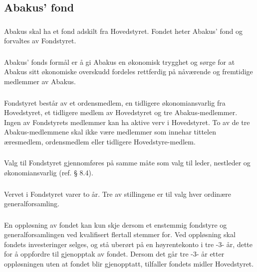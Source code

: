 \subsection{Abakus’ fond}

\subsubsection{}
Abakus skal ha et fond adskilt fra Hovedstyret. Fondet heter Abakus’ fond og forvaltes av Fondstyret.

\subsubsection{}
Abakus’ fonds formål er å gi Abakus en økonomisk trygghet og sørge for at Abakus sitt
økonomiske overskudd fordeles rettferdig på nåværende og fremtidige medlemmer av Abakus.

\subsubsection{}
Fondstyret består av et ordensmedlem, en tidligere økonomiansvarlig fra Hovedstyret, et tidligere
medlem av Hovedstyret og tre Abakus-medlemmer. Ingen av Fondstyrets medlemmer kan ha
aktive verv i Hovedstyret. To av de tre Abakus-medlemmene skal ikke være medlemmer som
innehar tittelen æresmedlem, ordensmedlem eller tidligere Hovedstyre-medlem.

\subsubsection{}
Valg til Fondstyret gjennomføres på samme måte som valg til leder, nestleder og
økonomiansvarlig (ref. § 8.4).

\subsubsection{}
Vervet i Fondstyret varer to år. Tre av stillingene er til valg hver ordinære generalforsamling.

\subsubsection{}
En oppløsning av fondet kan kun skje dersom et enstemmig fondstyre og generalforsamlingen
ved kvalifisert flertall stemmer for. Ved oppløsning skal fondets investeringer selges, og stå
uberørt på en høyrentekonto i tre -3- år, dette for å oppfordre til gjenopptak av fondet. Dersom
det går tre -3- år etter oppløsningen uten at fondet blir gjenopptatt, tilfaller fondets midler
Hovedstyret.

